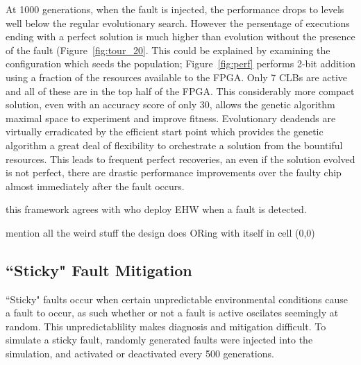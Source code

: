 At 1000 generations, when the fault is injected, the performance drops to levels
well below the regular evolutionary search. However the persentage of executions
ending with a perfect solution is much higher than evolution without the presence
of the fault (Figure~\ref{fig:tour_20}. This could be explained by examining the configuration which seeds
the population; Figure~\ref{fig:perf} performs 2-bit addition using a fraction of the
resources available to the FPGA. Only 7 CLBs are active and all of these are in the top
half of the FPGA. This considerably more compact solution, even with an accuracy score
of only 30, allows the genetic algorithm maximal space to experiment and improve fitness.
Evolutionary deadends are virtually
erradicated by the efficient start point which provides the genetic algorithm a great
deal of flexibility to orchestrate a solution from the bountiful resources.
This leads to frequent perfect recoveries, an even if the solution evolved is not perfect,
there are drastic performance improvements over the faulty chip almost immediately after
the fault occurs.

\todo this framework agrees with \cite{10.1007/3-540-61093-6_6} who deploy EHW when
a fault is detected.

\todo mention all the weird stuff the design does ORing with itself in cell (0,0)

\subsection{``Sticky" Fault Mitigation}
``Sticky" faults occur when certain unpredictable environmental conditions cause
a fault to occur, as such whether or not a fault is active oscilates seemingly at
random. This unpredictablility makes diagnosis and mitigation difficult.
To simulate a sticky fault, randomly generated faults were injected into the simulation,
and activated
or deactivated every 500 generations.


